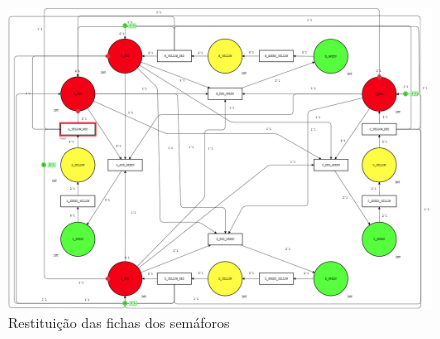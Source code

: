 \begin{figure}[ht]
	\centering
	\includegraphics[width=1\textwidth]{images/a_yellow_red_fired.png}
	\caption{Restituição das fichas dos semáforos}
    \label{fig:a_yellow_red_fired}
\end{figure}

\clearpage